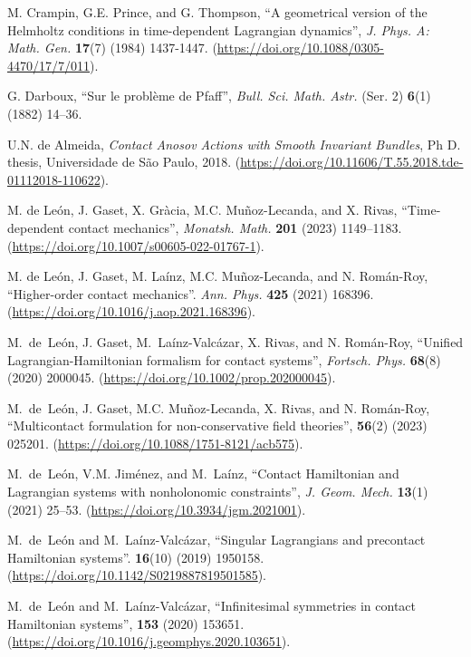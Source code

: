 \documentclass[12pt]{report}
\begin{document}
\begin{thebibliography}{999}
M. Crampin, G.E. Prince, and G. Thompson,
``A geometrical version of the Helmholtz conditions in time-dependent Lagrangian dynamics'',
{\sl J. Phys. A: Math. Gen.\/}
{\bf 17}(7) (1984) 1437-1447.
(\url{https://doi.org/10.1088/0305-4470/17/7/011}).

G. Darboux, ``Sur le probl\`eme de Pfaff'',
{\sl Bull. Sci. Math. Astr.} (Ser. 2) {\bf 6}(1) (1882) 14--36.
 
U.N. de Almeida,
{\it Contact Anosov Actions with Smooth Invariant Bundles}, Ph D. thesis,
Universidade de S{\~{a}}o Paulo, 2018.
(\url{https://doi.org/10.11606/T.55.2018.tde-01112018-110622}).

M. de Le\'on, J. Gaset, X. Gr\`acia, M.C. Mu\~noz-Lecanda, and X. Rivas,
``Time-dependent contact mechanics'',
{\sl Monatsh. Math.} {\bf 201} (2023) 1149--1183. 
(\url{https://doi.org/10.1007/s00605-022-01767-1}).

M. de Le\'on, J. Gaset, M. La\'inz, M.C. Mu\~noz-Lecanda, and N. Rom\'an-Roy,
``Higher-order contact mechanics''. 
{\sl Ann. Phys.} {\bf 425} (2021) 168396.
(\url{https://doi.org/10.1016/j.aop.2021.168396}).

M.~de~Le{\'{o}}n, J. Gaset, M.~La\'inz-Valc{\'{a}}zar, X. Rivas, and N. Rom\'an-Roy,
``Unified Lagrangian-Hamiltonian formalism for contact systems'',
{\sl Fortsch. Phys.} {\bf 68}(8) (2020) 2000045.
(\url{https://doi.org/10.1002/prop.202000045}).

M.~de~Le{\'{o}}n, J. Gaset, M.C. Mu\~noz-Lecanda, X. Rivas, and N. Rom\'an-Roy,
``Multicontact formulation for non-conservative field theories'',
 {\bf 56}(2) (2023) 025201.
(\url{https://doi.org/10.1088/1751-8121/acb575}).

M.~de~Le{\'{o}}n, V.M. Jim\'enez, and M.~La\'inz,
``Contact Hamiltonian and Lagrangian systems with nonholonomic constraints'',
{\sl J. Geom. Mech.} {\bf 13}(1) (2021) 25--53. 
(\url{https://doi.org/10.3934/jgm.2021001}).

M.~de~Le{\'{o}}n and M.~La\'inz-Valc{\'{a}}zar,
``Singular Lagrangians and precontact Hamiltonian systems''.
 {\bf 16}(10) (2019) 1950158.
(\url{https://doi.org/10.1142/S0219887819501585}).

M.~de~Le{\'{o}}n and M.~La\'inz-Valc{\'{a}}zar,
``Infinitesimal symmetries in contact Hamiltonian systems'',
 {\bf 153} (2020) 153651.
(\url{https://doi.org/10.1016/j.geomphys.2020.103651}).


\end{thebibliography}
\end{document}
